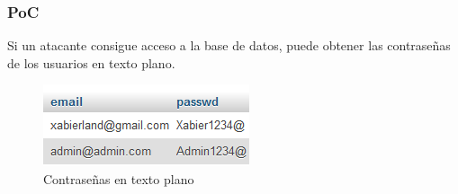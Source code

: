 \documentclass{report}
\begin{document}
                \subsubsection{PoC}
                    Si un atacante consigue acceso a la base de datos, puede obtener las contraseñas de los usuarios en texto plano.
                    \begin{figure}[H]
                        \centering
                        \includegraphics[width=\textwidth]{./img/vulnerabilidades/3.2/2.1.png}
                        \caption{Contraseñas en texto plano}
                    \end{figure}
\end{document}
